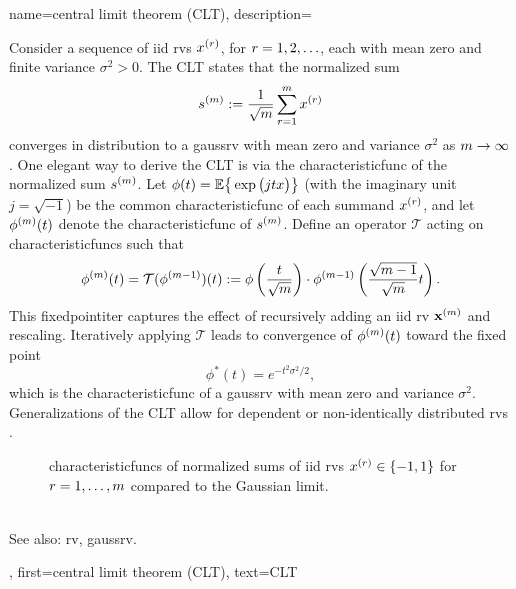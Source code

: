 {name={central limit theorem (CLT)},
	description={ Consider a sequence of \gls{iid} \glspl{rv} \( x^{(r)} \), for \( r = 1, 2, \ldots \), 
		each with \gls{mean} zero and finite \gls{variance} \( \sigma^2 > 0 \). 
		The  CLT states that the normalized sum 
		\[
		s^{(m)} := \frac{1}{\sqrt{m}} \sum_{r = 1}^{m} x^{(r)} 
		\]
		converges in distribution to a \gls{gaussrv} with \gls{mean} zero and \gls{variance} \( \sigma^2 \) as \( m \to \infty \) \cite[Proposition~2.17]{AsympVanderVaartBook}.
		One elegant way to derive the CLT is via the \gls{characteristicfunc} of the normalized sum \( s^{(m)} \). 
		Let $ \phi(t) = \mathbb{E} \big\{ \exp \big( j t x \big) \big\}$ (with the imaginary unit $j = \sqrt{-1}$) 
		be the common \gls{characteristicfunc} of each summand $x^{(r)}$, and let \( \phi^{(m)}(t) \) 
		denote the \gls{characteristicfunc} of \( s^{(m)} \). Define an operator \( \mathcal{T} \) acting on \glspl{characteristicfunc} 
		such that
		\[
		\phi^{(m)}(t) = \mathcal{T}(\phi^{(m-1)})(t) := \phi\left( \frac{t}{\sqrt{m}} \right) \cdot \phi^{(m-1)}\left( \frac{\sqrt{m-1}}{\sqrt{m}} t \right).
		\]
		This \gls{fixedpointiter} captures the effect of recursively adding an \gls{iid} \gls{rv} ${\bf x}^{(m)}$ 
		and rescaling. Iteratively applying \( \mathcal{T} \) leads to convergence of \( \phi^{(m)}(t) \) toward the fixed point
		\[
		\phi^*(t) = e^{-t^2 \sigma^2 / 2},
		\]
		which is the \gls{characteristicfunc} of a \gls{gaussrv} with \gls{mean} zero and \gls{variance} 
		\( \sigma^2 \). Generalizations of the CLT allow for dependent or non-identically distributed \glspl{rv} \cite[Section~2.8]{AsympVanderVaartBook}.
\begin{figure}
	\centering
	\caption{\Glspl{characteristicfunc} of normalized sums of \gls{iid} \glspl{rv} $x^{(r)} \in \{-1,1\}$ 
		for $r=1,\ldots,m$ compared to the Gaussian limit.}
\end{figure}
		\\ 
		See also: \gls{rv}, \gls{gaussrv}.},
	first={central limit theorem (CLT)},
	text={CLT}
}



